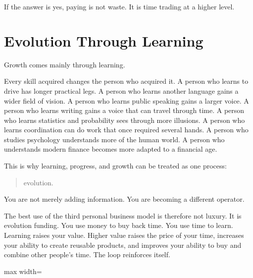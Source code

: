 If the answer is yes, paying is not waste. It is time trading at a higher level.

\section*{Evolution Through Learning}

Growth comes mainly through learning.

Every skill acquired changes the person who acquired it. A person who learns to drive has longer practical legs. A person who learns another language gains a wider field of vision. A person who learns public speaking gains a larger voice. A person who learns writing gains a voice that can travel through time. A person who learns statistics and probability sees through more illusions. A person who learns coordination can do work that once required several hands. A person who studies psychology understands more of the human world. A person who understands modern finance becomes more adapted to a financial age.

This is why learning, progress, and growth can be treated as one process:

\begin{quote}
evolution.
\end{quote}

You are not merely adding information. You are becoming a different operator.

The best use of the third personal business model is therefore not luxury. It is evolution funding. You use money to buy back time. You use time to learn. Learning raises your value. Higher value raises the price of your time, increases your ability to create reusable products, and improves your ability to buy and combine other people's time. The loop reinforces itself.

\begin{center}
\begin{adjustbox}{max width=\linewidth}
\end{adjustbox}
\end{center}

